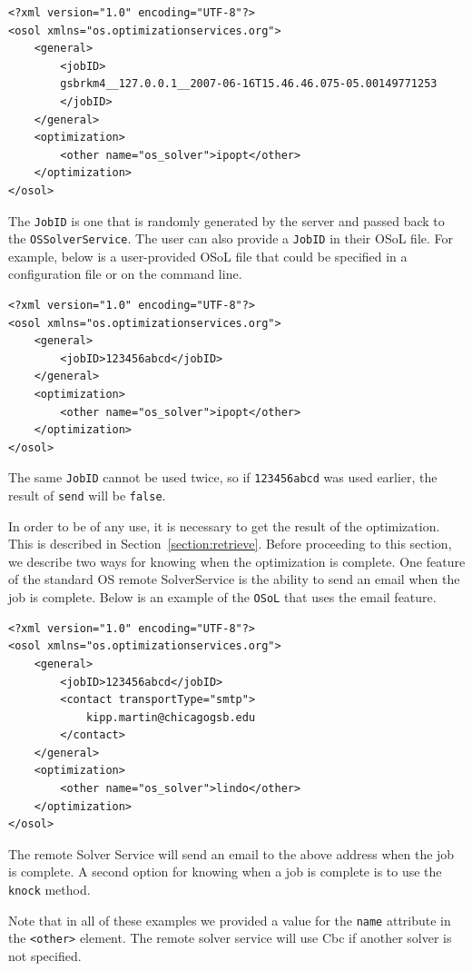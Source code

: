 \documentclass[11pt]{article}
\renewcommand{\_}{{\char"5F}}
\renewcommand{\{}{{\char"7B}}
\renewcommand{\}}{{\char"7D}}
\renewcommand{\^}{{\char"0D}}
\renewcommand{\'}{{\char"0D}}
\begin{document}
\begin{enumerate}[Step 1:]
\begin{verbatim}
<?xml version="1.0" encoding="UTF-8"?>
<osol xmlns="os.optimizationservices.org">
    <general>
        <jobID>
        gsbrkm4__127.0.0.1__2007-06-16T15.46.46.075-05.00149771253
        </jobID>
    </general>
    <optimization>
        <other name="os_solver">ipopt</other>
    </optimization>
</osol>
\end{verbatim}

The {\tt JobID} is one that is randomly generated by the server and passed back to the {\tt OSSolverService}. 
The user can also provide a {\tt JobID} in their OSoL file. For example, below is a user-provided OSoL file that could 
be specified in a configuration file or on the command line.

\begin{verbatim}
<?xml version="1.0" encoding="UTF-8"?>
<osol xmlns="os.optimizationservices.org">
    <general>
        <jobID>123456abcd</jobID>
    </general>
    <optimization>
        <other name="os_solver">ipopt</other>
    </optimization>
</osol>
\end{verbatim}

The same {\tt JobID} cannot be used twice, so if {\tt 123456abcd} was used earlier, the result of {\tt send} will be 
{\tt false}.

In order to be of any use, it is necessary to get the result of the optimization. This is described in 
Section~\ref{section:retrieve}. Before proceeding to this section, we describe two ways for knowing when 
the optimization is complete. One feature of the standard OS remote SolverService is the ability to send an 
email when the job is complete. Below is an example of the {\tt OSoL} that uses the email feature.

\begin{verbatim}
<?xml version="1.0" encoding="UTF-8"?>
<osol xmlns="os.optimizationservices.org">
    <general>
        <jobID>123456abcd</jobID>
        <contact transportType="smtp">
            kipp.martin@chicagogsb.edu
        </contact>
    </general>
    <optimization>
        <other name="os_solver">lindo</other>
    </optimization>
</osol> 
\end{verbatim}

The remote Solver Service will send an email to the above address when the job is complete. A second option for 
knowing when a job is complete is to use the {\tt knock} method.

Note that in all of these examples we provided a value for the {\tt name} attribute in the {\tt <other>} element. 
The remote solver service will use Cbc if another solver is not specified.%




\end{enumerate}
\end{document}
